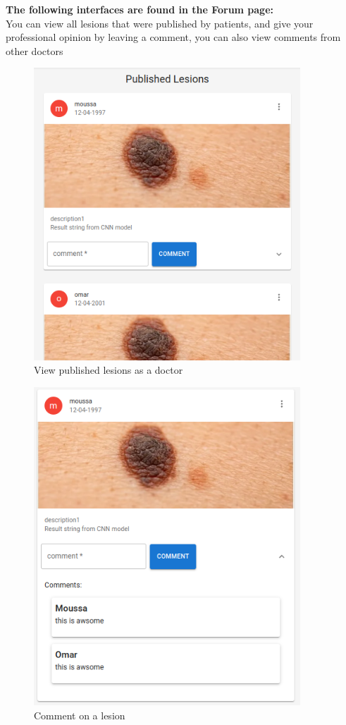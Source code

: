         
        \noindent \textbf{The following interfaces are found in the Forum page:} \\
        \noindent You can view all lesions that were published by patients, and give your professional opinion by leaving a comment, you can also view comments from other doctors
        \begin{figure}[H]
        \begin{center}
        \includegraphics[width=10cm]{./diagnosis-system/presentation-of-app/published-lesions.png}
        \end{center}
        \caption{View published lesions as a doctor}
        \label{fig:}
        \end{figure}

        

        \begin{figure}[H]
        \begin{center}
        \includegraphics[width=10cm]{./diagnosis-system/presentation-of-app/comment.png}
        \end{center}
        \caption{Comment on a lesion}
        \label{fig:}
        \end{figure}

